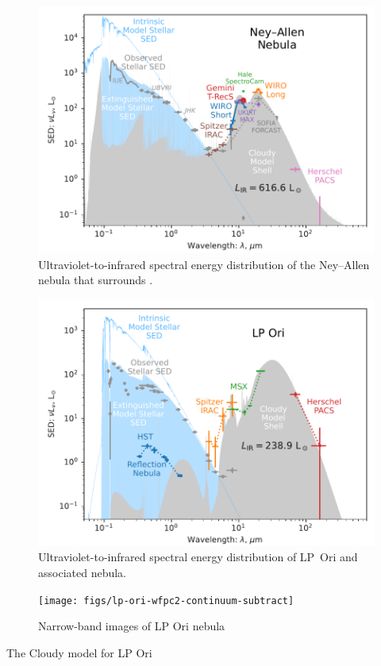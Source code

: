 \begin{figure}
  \centering
  \includegraphics[width=\linewidth]{figs/ney-allen-sed-edited}
  \caption{Ultraviolet-to-infrared spectral energy distribution of the Ney--Allen
    nebula that surrounds \thD. }
  \label{fig:ney-allen-sed}
\end{figure}


\begin{figure}
  \centering
  \includegraphics[width=\linewidth]{figs/lp-ori-sed-edited}
  \caption{Ultraviolet-to-infrared spectral energy distribution of LP~Ori
    and associated nebula. }
  \label{fig:lp-ori-sed}
\end{figure}

\begin{figure}
  \centering
  \texttt{[image: figs/lp-ori-wfpc2-continuum-subtract]}
  \caption{Narrow-band images of LP Ori nebula }
  \label{fig:lp-ori-sed}
\end{figure}

The Cloudy model for LP Ori


